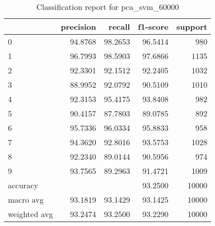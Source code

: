 \begin{table}[htb!]
\centering
\begin{tabular}{lrrrr}
    \toprule
    & precision & recall & f1-score & support \\
    \midrule
    0 & 94.8768 & 98.2653 & 96.5414 & 980 \\
    1 & 96.7993 & 98.5903 & 97.6866 & 1135 \\
    2 & 92.3301 & 92.1512 & 92.2405 & 1032 \\
    3 & 88.9952 & 92.0792 & 90.5109 & 1010 \\
    4 & 92.3153 & 95.4175 & 93.8408 & 982 \\
    5 & 90.4157 & 87.7803 & 89.0785 & 892 \\
    6 & 95.7336 & 96.0334 & 95.8833 & 958 \\
    7 & 94.3620 & 92.8016 & 93.5753 & 1028 \\
    8 & 92.2340 & 89.0144 & 90.5956 & 974 \\
    9 & 93.7565 & 89.2963 & 91.4721 & 1009 \\
    accuracy &  & & 93.2500 & 10000\\
    macro avg & 93.1819 & 93.1429 & 93.1425 & 10000 \\
    weighted avg & 93.2474 & 93.2500 & 93.2290 & 10000 \\
\bottomrule
\end{tabular}
\caption{Classification report for pca\_svm\_60000}
\label{tab:classification-report-pca_svm_60000}
\end{table}
